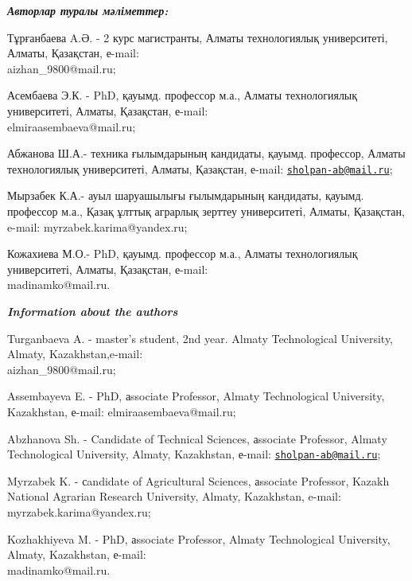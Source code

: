 \begin{authorinfo}
\emph{{\bfseries Авторлар туралы мәліметтер:}}

Тұрғанбаева A.Ә. - 2 курс магистранты, Алматы технологиялық
университеті, Алматы, Қазақстан, е-mail: \\aizhan\_9800@mail.ru;

Асембаева Э.К. - PhD, қауымд. профессор м.а., Алматы технологиялық
университеті, Алматы, Қазақстан, е-mail: \\elmiraasembaeva@mail.ru;

Абжанова Ш.А.- техника ғылымдарының кандидаты, қауымд. профессор, Алматы
технологиялық университеті, Алматы, Қазақстан, е-mail:
\href{mailto:sholpan-ab@mail.ru}{\nolinkurl{sholpan-ab@mail.ru}};

Мырзабек К.А.- ауыл шаруашылығы ғылымдарының кандидаты, қауымд.
профессор м.а., Қазақ ұлттық аграрлық зерттеу университеті, Алматы,
Қазақстан, e-mail: myrzabek.karima@yandex.ru;

Кожахиева М.О.- PhD, қауымд. профессор м.а., Алматы технологиялық
университеті, Алматы, Қазақстан, е-mail: \\madinamko@mail.ru.

\emph{{\bfseries Information about the authors}}

Turganbaeva A. - master's student, 2nd year. Almaty
Technological University, Almaty, Kazakhstan,e-mail:\\
aizhan\_9800@mail.ru;

Assembayeva E. - PhD, аssociate Professor, Almaty Technological
University, Kazakhstan, е-mail: elmiraasembaeva@mail.ru;

Abzhanova Sh. - Candidate of Technical Sciences, аssociate Professor,
Almaty Technological University, Almaty, Kazakhstan, е-mail:
\href{mailto:sholpan-ab@mail.ru}{\nolinkurl{sholpan-ab@mail.ru}};

Myrzabek K. - сandidate of Agricultural Sciences, аssociate
Professor, Kazakh National Agrarian Research University, Almaty,
Kazakhstan, e-mail: myrzabek.karima@yandex.ru;

Kozhakhiyeva M. - PhD, аssociate Professor, Almaty Technological
University, Almaty, Kazakhstan, е-mail: \\madinamko@mail.ru.
\end{authorinfo}
